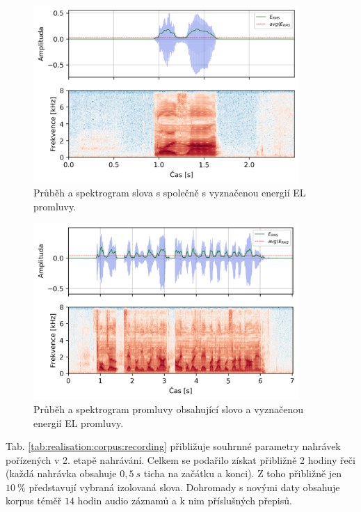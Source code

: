 \begin{figure}[hbpt]
  \centering
  \includegraphics[width=0.9\textwidth]{./ch5-construction/img/energy_spec_word.png}
  \caption{Průběh a spektrogram slova  s společně s vyznačenou energií EL promluvy.}
  \label{fig:realisation:corpus:word}
\end{figure}

\begin{figure}[hbpt]
  \centering
  \includegraphics[width=0.9\textwidth]{./ch5-construction/img/energy_spec_sentence.png}
  \caption{Průběh a spektrogram promluvy obsahující slovo  a vyznačenou energií EL promluvy.}
  \label{fig:realisation:corpus:sentence}
\end{figure}

Tab. \ref{tab:realisation:corpus:recording} přibližuje souhrnné parametry nahrávek pořízených v 2. etapě nahrávání. Celkem se podařilo získat přibližně 2 hodiny řeči (každá nahrávka obsahuje $0,5\ s$ ticha na začátku a konci). Z toho přibližně jen $10\ \%$ představují vybraná izolovaná slova. Dohromady s novými daty obsahuje korpus téměř $14$ hodin audio záznamů a k nim příslušných přepisů.

